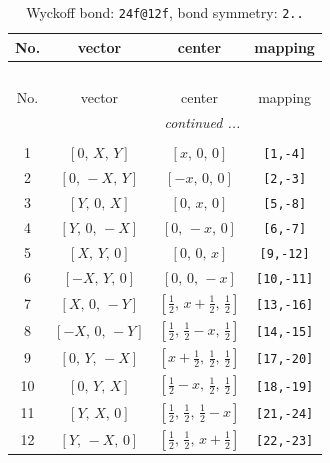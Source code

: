 \documentclass[fleqn,8pt]{jsarticle}
\begin{document}
\begin{longtable}{cccc}
\caption{Wyckoff bond: {\tt 24f@12f}, bond symmetry: {\tt 2..}}
 \\
 \hline \hline
No. & vector & center & mapping \\ \hline \endfirsthead

\multicolumn{3}{l}{\tablename\ \thetable{}} \\
 \hline \hline
No. & vector & center & mapping \\ \hline \endhead

 \hline \hline
\multicolumn{3}{r}{\footnotesize\it continued ...} \\ \endfoot

 \hline \hline
\multicolumn{3}{r}{} \\ \endlastfoot

1 & $\left[ 0,\, X,\, Y \right]$ & $\left[ x,\, 0,\, 0 \right]$ & {\tt [1,-4]} \\ \hline
2 & $\left[ 0,\, - X,\, Y \right]$ & $\left[ - x,\, 0,\, 0 \right]$ & {\tt [2,-3]} \\ \hline
3 & $\left[ Y,\, 0,\, X \right]$ & $\left[ 0,\, x,\, 0 \right]$ & {\tt [5,-8]} \\ \hline
4 & $\left[ Y,\, 0,\, - X \right]$ & $\left[ 0,\, - x,\, 0 \right]$ & {\tt [6,-7]} \\ \hline
5 & $\left[ X,\, Y,\, 0 \right]$ & $\left[ 0,\, 0,\, x \right]$ & {\tt [9,-12]} \\ \hline
6 & $\left[ - X,\, Y,\, 0 \right]$ & $\left[ 0,\, 0,\, - x \right]$ & {\tt [10,-11]} \\ \hline
7 & $\left[ X,\, 0,\, - Y \right]$ & $\left[ \frac{1}{2},\, x + \frac{1}{2},\, \frac{1}{2} \right]$ & {\tt [13,-16]} \\ \hline
8 & $\left[ - X,\, 0,\, - Y \right]$ & $\left[ \frac{1}{2},\, \frac{1}{2} - x,\, \frac{1}{2} \right]$ & {\tt [14,-15]} \\ \hline
9 & $\left[ 0,\, Y,\, - X \right]$ & $\left[ x + \frac{1}{2},\, \frac{1}{2},\, \frac{1}{2} \right]$ & {\tt [17,-20]} \\ \hline
10 & $\left[ 0,\, Y,\, X \right]$ & $\left[ \frac{1}{2} - x,\, \frac{1}{2},\, \frac{1}{2} \right]$ & {\tt [18,-19]} \\ \hline
11 & $\left[ Y,\, X,\, 0 \right]$ & $\left[ \frac{1}{2},\, \frac{1}{2},\, \frac{1}{2} - x \right]$ & {\tt [21,-24]} \\ \hline
12 & $\left[ Y,\, - X,\, 0 \right]$ & $\left[ \frac{1}{2},\, \frac{1}{2},\, x + \frac{1}{2} \right]$ & {\tt [22,-23]} \\ \hline

\end{longtable}
\end{document}

